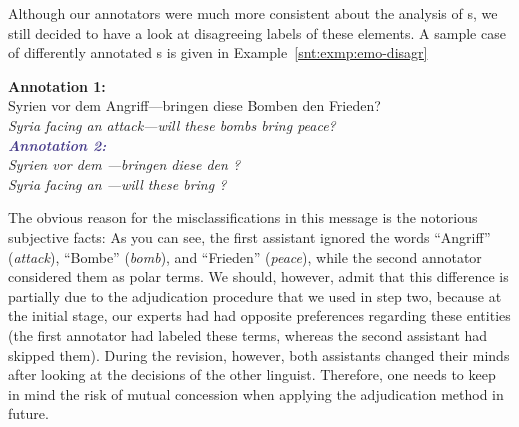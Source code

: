 Although our annotators were much more consistent about the analysis
of s, we still decided to have a look at
disagreeing labels of these elements.  A sample case of differently
annotated s is given in
Example~\ref{snt:exmp:emo-disagr}
\begin{example}\label{snt:exmp:emo-disagr}
  \textcolor{red3}{\textbf{Annotation 1:}}\\ \upshape{}Syrien vor dem
  Angriff---bringen diese Bomben den Frieden?\\[0.3em]\itshape
  \noindent\itshape{}Syria facing an attack---will these bombs bring
  peace?\\

  \noindent\textcolor{darkslateblue}{\textbf{\itshape Annotation
      2:}}\\ \upshape{}Syrien vor dem
  \emoexpression{\textcolor{red}{Angriff}}---bringen diese
  \emoexpression{\textcolor{red}{Bomben}} den
  \emoexpression{\textcolor{red}{Frieden}}?\\[0.3em]
  \noindent\itshape{}Syria facing an
  \upshape{}\itshape{}---will
  these
  \upshape{}\itshape{}
  bring
  \upshape{}\itshape{}?
\end{example}
The obvious reason for the misclassifications in this message is the
notorious subjective facts: As you can see, the first assistant
ignored the words ``Angriff'' (\emph{attack}), ``Bombe''
(\emph{bomb}), and ``Frieden'' (\emph{peace}), while the second
annotator considered them as polar terms.
We should, however, admit that this difference is partially due to the
adjudication procedure that we used in step two, because at the
initial stage, our experts had had opposite preferences regarding
these entities (the first annotator had labeled these terms, whereas
the second assistant had skipped them).  During the revision, however,
both assistants changed their minds after looking at the decisions of
the other linguist.  Therefore, one needs to keep in mind the risk of
mutual concession when applying the adjudication method in future.

